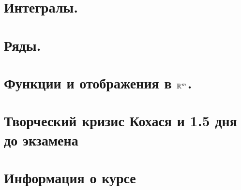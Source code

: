 \maketitle
\tableofcontents


\newpage
\section{Интегралы.}


\newpage
\section{Ряды.}


\newpage
\section{Функции и отображения в $\mathbb{R}^m$.}


\newpage
\section{Творческий кризис Кохася и 1.5 дня до экзамена}



\newpage
\section{Информация о курсе}
